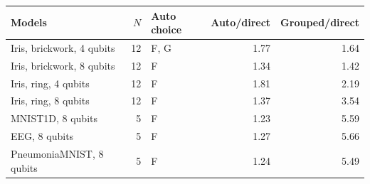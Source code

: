 \begin{tabular}{lrlrr}
\toprule
Models & $N$ & Auto choice & Auto/direct & Grouped/direct\\
\midrule
Iris, brickwork, 4 qubits & 12 & F, G & 1.77 & 1.64\\
Iris, brickwork, 8 qubits & 12 & F & 1.34 & 1.42\\
Iris, ring, 4 qubits & 12 & F & 1.81 & 2.19\\
Iris, ring, 8 qubits & 12 & F & 1.37 & 3.54\\
\midrule
MNIST1D, 8 qubits & 5 & F & 1.23 & 5.59\\
EEG, 8 qubits & 5 & F & 1.27 & 5.66\\
PneumoniaMNIST, 8 qubits & 5 & F & 1.24 & 5.49\\
\bottomrule
\end{tabular}
